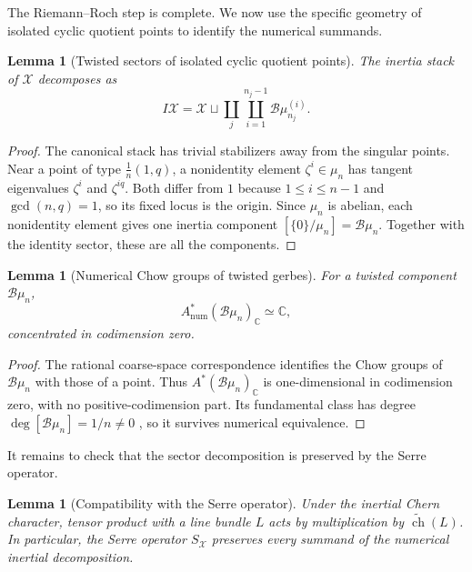 \documentclass[11pt]{article}
\theoremstyle{plain}
\newtheorem{lemma}[theorem]{Lemma}
\theoremstyle{definition}
\theoremstyle{remark}
\newcommand{\cX}{\mathcal X}
\newcommand{\C}{\mathbb C}
\newcommand{\1}{\mathbf 1}
\begin{document}
The Riemann--Roch step is complete.  We now use the specific geometry of isolated cyclic quotient points to identify the numerical summands.

\begin{lemma}[Twisted sectors of isolated cyclic quotient points]\label{lem:app-sectors}
The inertia stack of $\cX$ decomposes as
\[
I\cX=\cX\sqcup\coprod_j\coprod_{i=1}^{n_j-1}\mathcal B\mu_{n_j}^{(i)}.
\]
\end{lemma}

\begin{proof}
The canonical stack has trivial stabilizers away from the singular points.  Near a point of type $\frac1n(1,q)$, a nonidentity element $\zeta^i\in\mu_n$ has tangent eigenvalues $\zeta^i$ and $\zeta^{iq}$.  Both differ from $1$ because $1\le i\le n-1$ and $\gcd(n,q)=1$, so its fixed locus is the origin.  Since $\mu_n$ is abelian, each nonidentity element gives one inertia component $[\{0\}/\mu_n]=\mathcal B\mu_n$.  Together with the identity sector, these are all the components.
\end{proof}

\begin{lemma}[Numerical Chow groups of twisted gerbes]\label{lem:app-gerbe-chow}
For a twisted component $\mathcal B\mu_n$,
\[
A^*_{\mathrm{num}}(\mathcal B\mu_n)_{\C}\simeq\C,
\]
concentrated in codimension zero.
\end{lemma}

\begin{proof}
The rational coarse-space correspondence \cite[Proposition 6.1]{Vistoli} identifies the Chow groups of $\mathcal B\mu_n$ with those of a point.  Thus $A^*(\mathcal B\mu_n)_{\C}$ is one-dimensional in codimension zero, with no positive-codimension part.  Its fundamental class has degree $\deg[\mathcal B\mu_n]=1/n\ne0$ \cite[Section 3.2.1]{Edidin}, so it survives numerical equivalence.
\end{proof}

It remains to check that the sector decomposition is preserved by the Serre operator.

\begin{lemma}[Compatibility with the Serre operator]\label{lem:app-serre}
Under the inertial Chern character, tensor product with a line bundle $L$ acts by multiplication by $\widetilde{\operatorname{ch}}(L)$.  In particular, the Serre operator $S_{\cX}$ preserves every summand of the numerical inertial decomposition.
\end{lemma}
\end{document}

